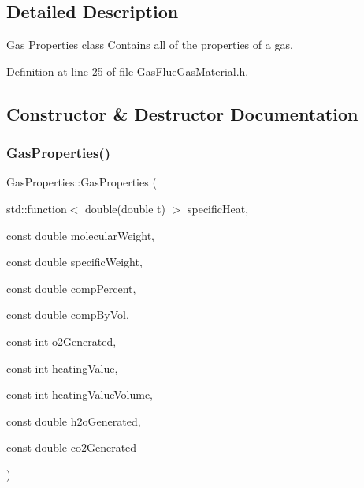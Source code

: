 \subsection{Detailed Description}
Gas Properties class Contains all of the properties of a gas. 

Definition at line 25 of file Gas\+Flue\+Gas\+Material.\+h.



\subsection{Constructor \& Destructor Documentation}
\mbox{\label{class_gas_properties_a8959cd25ac00e9e0e75cd957eca74e5e}} 
\subsubsection{\texorpdfstring{Gas\+Properties()}{GasProperties()}\hspace{0.1cm}{\footnotesize\ttfamily [1/3]}}
{\footnotesize\ttfamily Gas\+Properties\+::\+Gas\+Properties (\begin{DoxyParamCaption}\item[{std\+::function$<$ double(double t) $>$}]{specific\+Heat,  }\item[{const double}]{molecular\+Weight,  }\item[{const double}]{specific\+Weight,  }\item[{const double}]{comp\+Percent,  }\item[{const double}]{comp\+By\+Vol,  }\item[{const int}]{o2\+Generated,  }\item[{const int}]{heating\+Value,  }\item[{const int}]{heating\+Value\+Volume,  }\item[{const double}]{h2o\+Generated,  }\item[{const double}]{co2\+Generated }\end{DoxyParamCaption})\hspace{0.3cm}{\ttfamily [inline]}}

